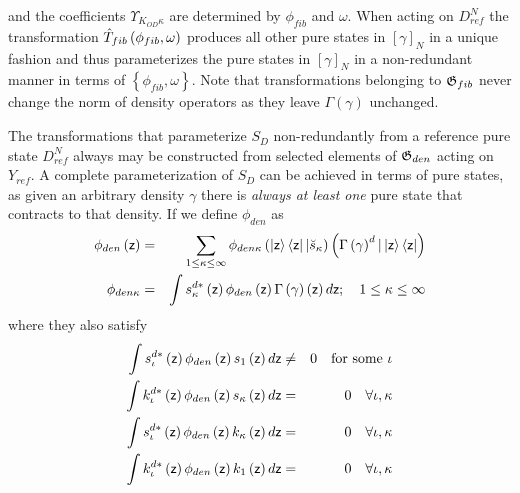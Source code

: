 and the coefficients $\Upsilon _{K_{OD}\kappa }$ are determined by $\phi
_{fib}$ and $\omega $. When acting on $D_{ref}^{N}$ the transformation $\hat{%
T}_{fib}\left( \phi _{fib},\omega \right) $ produces all other pure states
in $\left[ \gamma \right] _{N}$ in a unique fashion and thus parameterizes
the pure states in $\left[ \gamma \right] _{N}$ in a non-redundant manner in
terms of $\left\{ \phi _{fib},\omega \right\} $. Note that transformations
belonging to ${\frak G}_{fib}$ never change the norm of density operators as
they leave $\Gamma \left( \gamma \right) $ unchanged.

The transformations that parameterize $S_{D}$ non-redundantly from a
reference pure state $D_{ref}^{N}$ always may be constructed from selected
elements of ${\frak G}_{den}$ acting on $Y_{ref}$. A complete
parameterization of $S_{D}$ can be achieved in terms of pure states, as
given an arbitrary density $\gamma $ there is {\em always at least one} pure
state that contracts to that density. If we define $\phi _{den}$ as 
\begin{eqnarray}
\phi _{den}\left( {\sf z}\right) &=&\sum_{1\leq \kappa \leq \infty }\phi
_{den\kappa }\left( \left| {\sf z}\right\rangle \left\langle {\sf z}\right| |%
\breve{s}_{\kappa }\right) \left( \Gamma \left( \gamma \right) ^{d}|\left| 
{\sf z}\right\rangle \left\langle {\sf z}\right| \right)  \nonumber \\
\phi _{den\kappa } &=&\int s_{\kappa }^{d\ast }\left( {\sf z}\right) \phi
_{den}\left( {\sf z}\right) \Gamma \left( \gamma \right) \left( {\sf z}%
\right) d{\sf z};\quad 1\leq \kappa \leq \infty
\end{eqnarray}%
where they also satisfy 
\begin{eqnarray}
\int s_{\iota }^{d\ast }\left( {\sf z}\right) \phi _{den}\left( {\sf z}%
\right) s_{1}\left( {\sf z}\right) d{\sf z} &\neq &0\quad \text{for some }%
\iota  \nonumber \\
\int k_{\iota }^{d\ast }\left( {\sf z}\right) \phi _{den}\left( {\sf z}%
\right) s_{\kappa }\left( {\sf z}\right) d{\sf z} &=&0\quad \forall \iota
,\kappa  \nonumber \\
\int s_{\iota }^{d\ast }\left( {\sf z}\right) \phi _{den}\left( {\sf z}%
\right) k_{\kappa }\left( {\sf z}\right) d{\sf z} &=&0\quad \forall \iota
,\kappa  \nonumber \\
\int k_{\iota }^{d\ast }\left( {\sf z}\right) \phi _{den}\left( {\sf z}%
\right) k_{1}\left( {\sf z}\right) d{\sf z} &=&0\quad \forall \iota ,\kappa
\end{eqnarray}%
